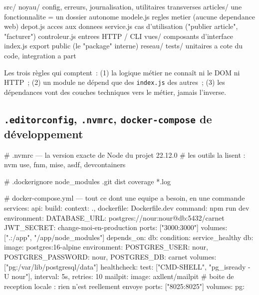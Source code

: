 \begin{codeplain}
src/
  noyau/            config, erreurs, journalisation, utilitaires transverses
  articles/         une fonctionnalite = un dossier autonome
    modele.js       regles metier (aucune dependance web)
    depot.js        acces aux donnees
    service.js      cas d'utilisation ("publier article", "facturer")
    controleur.js   entrees HTTP / CLI
    vues/           composants d'interface
    index.js        export public (le "package" interne)
  reseau/
  tests/            unitaires a cote du code, integration a part
\end{codeplain}

Les trois r\`egles qui comptent~: (1) la logique m\'etier ne conna\^it ni le DOM ni HTTP~;
(2) un module ne d\'epend que des \verb|index.js| des autres~; (3) les d\'ependances vont des
couches techniques vers le m\'etier, jamais l'inverse.

\subsection{\texttt{.editorconfig}, \texttt{.nvmrc}, \texttt{docker-compose} de d\'eveloppement}

\begin{codeplain}
# .nvmrc --- la version exacte de Node du projet
22.12.0
# les outils la lisent : nvm use, fnm, mise, asdf, devcontainers

# .dockerignore
node_modules
.git
dist
coverage
*.log
\end{codeplain}

\begin{codeyml}
# docker-compose.yml --- tout ce dont une equipe a besoin, en une commande
services:
  api:
    build: { context: ., dockerfile: Dockerfile.dev }
    command: npm run dev
    environment:
      DATABASE_URL: postgres://nour:nour@db:5432/carnet
      JWT_SECRET: change-moi-en-production
    ports: ["3000:3000"]
    volumes: [".:/app", "/app/node_modules"]
    depends_on: { db: { condition: service_healthy } }
  db:
    image: postgres:16-alpine
    environment: { POSTGRES_USER: nour, POSTGRES_PASSWORD: nour, POSTGRES_DB: carnet }
    volumes: ["pg:/var/lib/postgresql/data"]
    healthcheck: { test: ["CMD-SHELL", "pg_isready -U nour"], interval: 5s, retries: 10 }
  mailpit:
    image: axllent/mailpit        # boite de reception locale : rien n'est reellement envoye
    ports: ["8025:8025"]
volumes: { pg: {} }
\end{codeyml}

